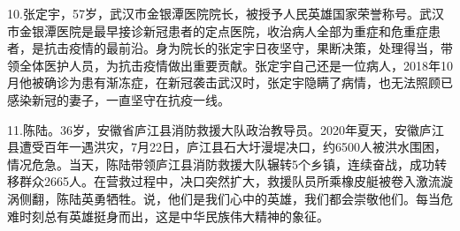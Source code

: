 \documentclass[UTF8]{ctexart}
\begin{document}
10.张定宇，57岁，武汉市金银潭医院院长，被授予人民英雄国家荣誉称号。武汉市金银潭医院是最早接诊新冠患者的定点医院，收治病人全部为重症和危重症患者，是抗击疫情的最前沿。身为院长的张定宇日夜坚守，果断决策，处理得当，带领全体医护人员，为抗击疫情做出重要贡献。张定宇自己还是一位病人，2018年10月他被确诊为患有渐冻症，在新冠袭击武汉时，张定宇隐瞒了病情，也无法照顾已感染新冠的妻子，一直坚守在抗疫一线。\par
11.陈陆。36岁，安徽省庐江县消防救援大队政治教导员。2020年夏天，安徽庐江县遭受百年一遇洪灾，7月22日，庐江县石大圩漫堤决口，约6500人被洪水围困，情况危急。当天，陈陆带领庐江县消防救援大队辗转5个乡镇，连续奋战，成功转移群众2665人。在营救过程中，决口突然扩大，救援队员所乘橡皮艇被卷入激流漩涡侧翻，陈陆英勇牺牲。说，他们是我们心中的英雄，我们都会崇敬他们。每当危难时刻总有英雄挺身而出，这是中华民族伟大精神的象征。\par
\end{document}
